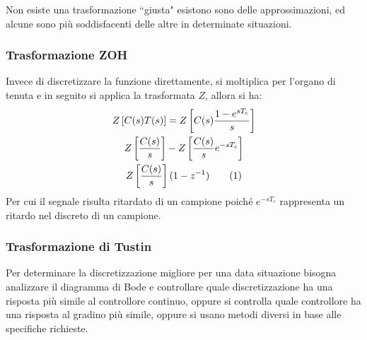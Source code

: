 \documentclass{article}
\numberwithin{equation}{subsection}
\newcommand{\tageq}{\tag{\stepcounter{equation}\theequation}}
\begin{document}
Non esiste una trasformazione ``giusta" esistono sono delle approssimazioni, ed alcune sono più soddisfacenti delle altre in determinate situazioni.  

\subsubsection{Trasformazione ZOH}

Invece di discretizzare la funzione direttamente, si moltiplica per l'organo di tenuta e in seguito si applica la trasformata $Z$, allora si ha:
\begin{gather*}
    Z\left[C(s)T(s)\right]=Z\left[C(s)\displaystyle\frac{1-e^{sT_c}}{s}\right]\\
    Z\left[\displaystyle\frac{C(s)}{s}\right]-Z\left[\displaystyle\frac{C(s)}{s}e^{-sT_c}\right]\\
    Z\left[\displaystyle\frac{C(s)}{s}\right](1-z^{-1})\tageq
\end{gather*}
Per cui il segnale risulta ritardato di un campione poiché $e^{-sT_c}$ rappresenta un ritardo nel discreto di un campione. 

\subsubsection{Trasformazione di Tustin}

Per determinare la discretizzazione migliore per una data situazione bisogna analizzare il diagramma di Bode e controllare quale discretizzazione ha una risposta più simile 
al controllore continuo, oppure si controlla quale controllore ha una risposta al gradino più simile, oppure si usano metodi diversi in base alle specifiche richieste. 
\end{document}
